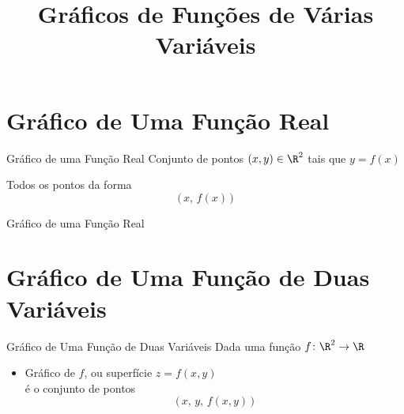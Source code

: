 
\usepackage{calculo_varias_variaveis-1}

\title{Gráficos de Funções de Várias Variáveis}



\addtitle

\section{Gráfico de Uma Função Real}

\begin{frame}{Gráfico de uma Função Real}
  Conjunto de pontos $(x, y) \in \R^2$ tais que \(y = f(x)\)

  \pause
  \vspace{\baselineskip}
  Todos os pontos da forma
  \[
    \big( \, x, \, f(x) \, \big)
  \]
\end{frame}

\begin{frame}{Gráfico de uma Função Real}
  \centering
  
\end{frame}

\section{Gráfico de Uma Função de Duas Variáveis}

\begin{frame}{Gráfico de Uma Função de Duas Variáveis}
  Dada uma função \(f\colon\R^2\to\R\)
  \begin{itemize}[<+->]
    \item Gráfico de $f$, ou superfície \(z=f(x, y)\) \\
    é o conjunto de pontos
    \[
      \big( \, x, \, y, \, f(x, y) \, \big)
    \]
  \end{itemize}
\end{frame}


